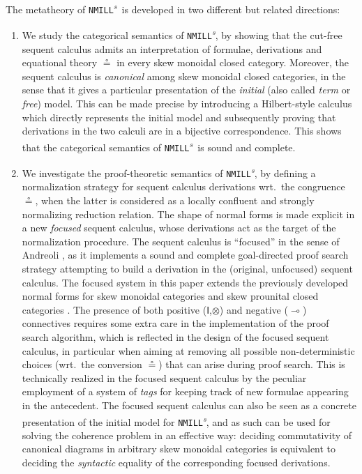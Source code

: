 \documentclass[submission,copyright,creativecommons]{eptcs}
\theoremstyle{definition}
\newcommand{\ot}{\otimes}
\newcommand{\lolli}{\multimap}
\newcommand{\I}{\mathsf{I}}
\newcommand{\NMILL}{\texttt{NMILL}}
\newcommand{\SkNMILL}{\NMILL\textsuperscript{\textit{s}}}
\begin{document}
The metatheory of \SkNMILL\ is developed in two different but related directions:
\begin{enumerate}[($i$)]
  \item We study the categorical semantics of \SkNMILL, by showing that the cut-free sequent calculus admits an interpretation of formulae, derivations and equational theory $\circeq$ in every skew monoidal closed category. Moreover, the sequent calculus is \emph{canonical} among skew monoidal closed categories, in the sense that it gives a particular presentation of the \emph{initial} (also called \emph{term} or \emph{free}) model. This can be made precise by introducing a Hilbert-style calculus which directly represents the initial model and subsequently proving that derivations in the two calculi are in a bijective correspondence.
This shows that the categorical semantics of \SkNMILL\ is sound and
complete.

\item We investigate the proof-theoretic semantics of \SkNMILL, by defining a normalization strategy for sequent calculus derivations wrt.\ the congruence $\circeq$, when the latter is considered as a locally confluent and strongly normalizing reduction relation. The shape of normal forms is made explicit in a new \emph{focused} sequent calculus, whose derivations act as the target of the normalization procedure. The sequent calculus is ``focused'' in the sense of Andreoli \cite{andreoli:logic:1992}, as it implements a sound and complete goal-directed proof search strategy attempting to build a derivation in the (original, unfocused) sequent calculus. The focused system in this paper extends the previously
developed normal forms for skew monoidal categories \cite{uustalu:sequent:2021} and skew prounital closed categories \cite{uustalu:deductive:nodate}. The presence of both positive ($\I$,$\ot$) and negative ($\lolli$) connectives requires some extra care in the implementation of the proof search algorithm, which is reflected in the design of the focused sequent calculus, in particular when aiming at removing all possible non-deterministic choices (wrt.\ the conversion $\circeq$) that can arise during proof search. This is technically realized in the focused sequent calculus by the peculiar employment of a system of \emph{tags} for keeping track of new formulae appearing in the antecedent. The focused sequent calculus can also be seen as a concrete presentation of the initial model for \SkNMILL, and as such can be used for solving the coherence problem in an effective way: deciding commutativity of canonical diagrams in arbitrary skew monoidal categories is equivalent to deciding the \emph{syntactic} equality of the corresponding focused derivations.
\end{enumerate}
\end{document}
